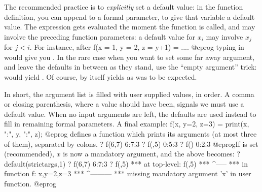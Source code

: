 The recommended practice is to \emph{explicitly} set a default value:
in the function definition, you can append \kbd{=} to a formal
parameter, to give that variable a default value. The expression
gets evaluated the moment the function is called, and may involve the
preceding function parameters: a default value for $x_i$ may involve $x_j$
for $j < i$. For instance, after
\bprog
f(x = 1, y = 2, z = y+1) = ....
@eprog\noindent
typing in  would give you . In the rare case when
you want to set some far away argument, and leave the defaults in between as
they stand, use the ``empty argument'' trick:  would yield
. Of course,  by itself yields  as was
to be expected.

In short, the argument list is filled with user supplied values, in
order. A comma or closing parenthesis, where a value should have been,
signals we must use a default value. When no input arguments are left, the
defaults are used instead to fill in remaining formal parameters.
A final example:
\bprog
f(x, y=2, z=3) = print(x, ":", y, ":", z);
@eprog
\noindent defines a function which prints its arguments (at most three of
them), separated by colons.
\bprog
? f(6,7)
6:7:3
? f(,5)
0:5:3
? f()
0:2:3
@eprog\noindent If  is set (recommended), $x$ is now a
mandatory argument, and the above becomes:
\bprog
? default(strictargs,1)
? f(6,7)
6:7:3
? f(,5)
  ***   at top-level: f(,5)
  ***                 ^-----
  ***   in function f: x,y=2,z=3
  ***                  ^---------
  ***   missing mandatory argument 'x' in user function.
@eprog

